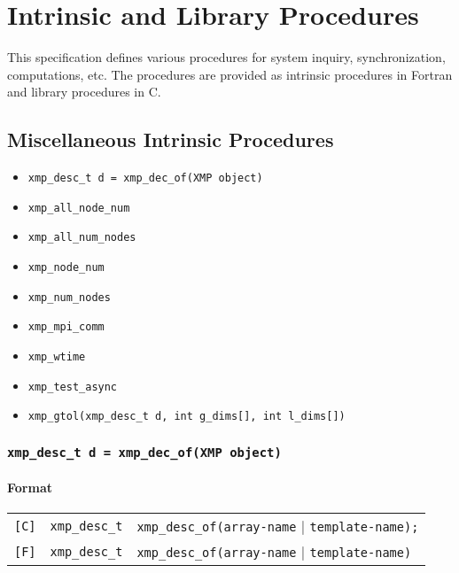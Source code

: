 \chapter{Intrinsic and Library Procedures}
\label{chap:Intrinsic and library procedures}

This specification defines various procedures for system inquiry,
synchronization, computations, etc. The procedures are provided as
intrinsic procedures in Fortran and library procedures in C.

\section{Miscellaneous Intrinsic Procedures}

\begin{itemize}
 \item {\tt xmp\_desc\_t d = xmp\_dec\_of(XMP object)}
 \item {\tt xmp\_all\_node\_num}
 \item {\tt xmp\_all\_num\_nodes}
 \item {\tt xmp\_node\_num}
 \item {\tt xmp\_num\_nodes}
 \item {\tt xmp\_mpi\_comm}
 \item {\tt xmp\_wtime}
 \item {\tt xmp\_test\_async}
 \item {\tt xmp\_gtol(xmp\_desc\_t d, int g\_dims[], int l\_dims[])}
\end{itemize}

\vspace{0.3cm}

\subsection{\tt xmp\_desc\_t d = xmp\_dec\_of(XMP object)}

\subsubsection*{Format}

\begin{tabular}{lll}

\verb![C]!&  {\tt xmp\_desc\_t}& {\tt xmp\_desc\_of(array-name} $\vert$ {\tt template-name);}\\

\verb![F]!&  {\tt xmp\_desc\_t}& {\tt xmp\_desc\_of(array-name} $\vert$ {\tt template-name)}
\end{tabular}

